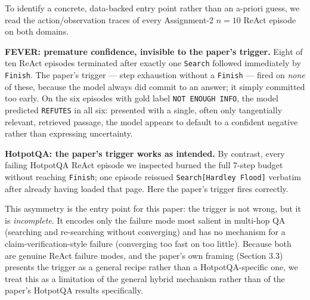 To identify a concrete, data-backed entry point rather than an
a-priori guess, we read the action/observation traces of every
Assignment-2 $n{=}10$ ReAct episode on both domains.

\textbf{FEVER: premature confidence, invisible to the paper's trigger.}
Eight of ten ReAct episodes terminated after exactly one \texttt{Search}
followed immediately by \texttt{Finish}. The paper's trigger --- step
exhaustion without a \texttt{Finish} --- fired on \emph{none} of these,
because the model always did commit to an answer; it simply committed too
early. On the six episodes with gold label \texttt{NOT ENOUGH INFO}, the
model predicted \texttt{REFUTES} in all six: presented with a single,
often only tangentially relevant, retrieved passage, the model appears to
default to a confident negative rather than expressing uncertainty.

\textbf{HotpotQA: the paper's trigger works as intended.} By contrast,
every failing HotpotQA ReAct episode we inspected burned the full 7-step
budget without reaching \texttt{Finish}; one episode reissued
\texttt{Search[Hardley Flood]} verbatim after already having loaded that
page. Here the paper's trigger fires correctly.

This asymmetry is the entry point for this paper: the trigger is not
wrong, but it is \emph{incomplete}. It encodes only the failure mode most
salient in multi-hop QA (searching and re-searching without converging)
and has no mechanism for a claim-verification-style failure (converging
too fast on too little). Because both are genuine ReAct failure modes,
and the paper's own framing (Section 3.3) presents the trigger as a
general recipe rather than a HotpotQA-specific one, we treat this as a
limitation of the general hybrid mechanism rather than of the paper's
HotpotQA results specifically.
